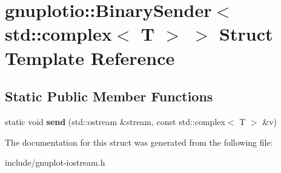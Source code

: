 \hypertarget{structgnuplotio_1_1BinarySender_3_01std_1_1complex_3_01T_01_4_01_4}{}\section{gnuplotio\+:\+:Binary\+Sender$<$ std\+:\+:complex$<$ T $>$ $>$ Struct Template Reference}
\label{structgnuplotio_1_1BinarySender_3_01std_1_1complex_3_01T_01_4_01_4}
\subsection*{Static Public Member Functions}
\begin{DoxyCompactItemize}
\item 
\mbox{\label{structgnuplotio_1_1BinarySender_3_01std_1_1complex_3_01T_01_4_01_4_a759de700a1cd68000830a4b15a6fec49}} 
static void {\bfseries send} (std\+::ostream \&stream, const std\+::complex$<$ T $>$ \&v)
\end{DoxyCompactItemize}


The documentation for this struct was generated from the following file\+:\begin{DoxyCompactItemize}
\item 
include/gnuplot-\/iostream.\+h\end{DoxyCompactItemize}
